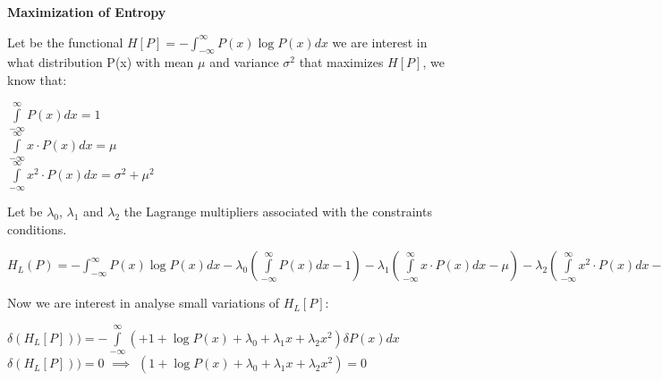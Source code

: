 \documentclass[paper=9in:6in,pagesize=pdftex,headinclude=on,footinclude=on,10pt,bibtotoc,pointlessnumbers,normalheadings,DIV=9,twoside=false]{scrbook}
\begin{document}
\date{}

\begin{center}
\begin{large}
 \textbf{Maximization of Entropy \\}
\end{large}
\end{center}
\begin{text} 
 Let be the functional $H[P]=-\int_{-\infty}^{\infty} P(x) \log{P(x)} dx$ we are interest in what distribution P(x) with mean $\mu$  and variance $ \sigma ^2$ that maximizes $H[P]$, we know that: \\
\end{text}

\begin{center}
    $\int\limits_{-\infty}^{\infty} P(x) dx = 1$ \\
    $\int\limits_{-\infty}^{\infty} x \cdot P(x) dx = \mu $ \\
    $\int\limits_{-\infty}^{\infty} x^2 \cdot P(x) dx = \sigma^2 + \mu^2$
\end{center}

\begin{text}
Let be $\lambda_0$, $\lambda_1$ and $\lambda_2$ the Lagrange multipliers associated with the constraints conditions.
\end{text}

\begin{small}
$H_L(P)= -\int_{-\infty}^{\infty} P(x) \log{P(x)} dx - \lambda_0 (\int\limits_{-\infty}^{\infty} P(x) dx -1) - \lambda_1 ( \int\limits_{-\infty}^{\infty} x \cdot P(x) dx - \mu) - \lambda_2 (\int\limits_{-\infty}^{\infty} x^2 \cdot P(x) dx - \sigma^2 - \mu^2)  $\\
\end{small}

\begin{text}
Now we are interest in analyse small variations of $H_L[P]$: \\
\end{text}

\begin{center}
   $ \delta (H_L[P])) = -\int\limits_{-\infty}^{\infty} (+1 + \log{P(x)} + \lambda_0 + \lambda_1 x + \lambda_2 x^2) \delta P(x) dx$ \\
   $ \delta (H_L[P])) = 0$ $\implies$ $(1 + \log{P(x)} + \lambda_0 + \lambda_1 x + \lambda_2 x^2)=0$  \\
   \end{center}
   
\end{document}
